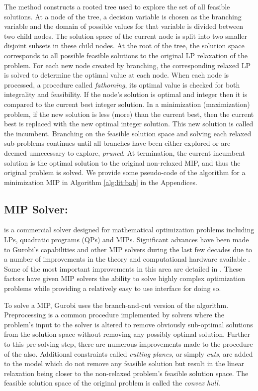 The \bab method constructs a rooted tree used to explore the set of
all feasible solutions.
At a node of the tree, a decision variable is chosen as
the branching variable and the domain
of possible values for that variable is divided
between two child nodes.
The solution space of the current node is split
into two smaller disjoint subsets in these child nodes.
At the root of the tree, the solution space corresponds to all
possible feasible solutions to the original LP relaxation of the problem.
For each new node created by branching, the corresponding
relaxed LP is solved to determine the optimal
value at each node.
When each node is processed, a procedure called \emph{fathoming},
its optimal value is checked for both
integrality and feasibility.
If the node's solution is optimal and integer then it is compared to
the current best integer solution.
In a minimization (maximization) problem, if the new solution 
is less (more) than the current best, then 
the current best is replaced with the new optimal integer solution.
This new solution is called the incumbent.
Branching on the feasible solution space and solving each
relaxed sub-problems continues until all branches have been either
explored or are deemed unnecessary to explore, \ie \emph{pruned}.
At termination, the current incumbent solution is the optimal solution
to the original non-relaxed MIP, and thus the original problem
is solved.
We provide some pseudo-code of the \bab algorithm
for a minimization MIP in Algorithm \ref{alg:lit:bab}
in the Appendices.

\subsection{MIP Solver: \gurobi}
\label{sec:lit:mipGurobi}
\gurobi is a commercial solver designed for mathematical optimization problems including
LPs, quadratic programs (QPs) and MIPs.
Significant advances have been made to Gurobi's capabilities and other MIP solvers
during the last few decades due to a number of improvements
in the theory and computational hardware available \cite{Bixby2002}.
Some of the most important improvements in this area
are detailed in .
These factors have given MIP solvers the ability to 
solve highly complex optimization problems while providing
a relatively easy to use interface for doing so.

To solve a MIP, Gurobi uses the branch-and-cut version
of the \bab algorithm.
Preprocessing is a common procedure implemented by solvers
where the problem's input to the solver is altered 
to remove obviously sub-optimal solutions from 
the solution space without removing any possibly optimal solution.
Further to this pre-solving step, there are numerous 
improvements made to the procedure of the \bab also.
Additional constraints called \emph{cutting planes}, or
simply \emph{cuts}, are added to the model
which do not remove any feasible solution but result in the linear relaxation
being closer to the non-relaxed problem's feasible solution space.
The feasible solution space of the original problem is
called the \emph{convex hull}.

